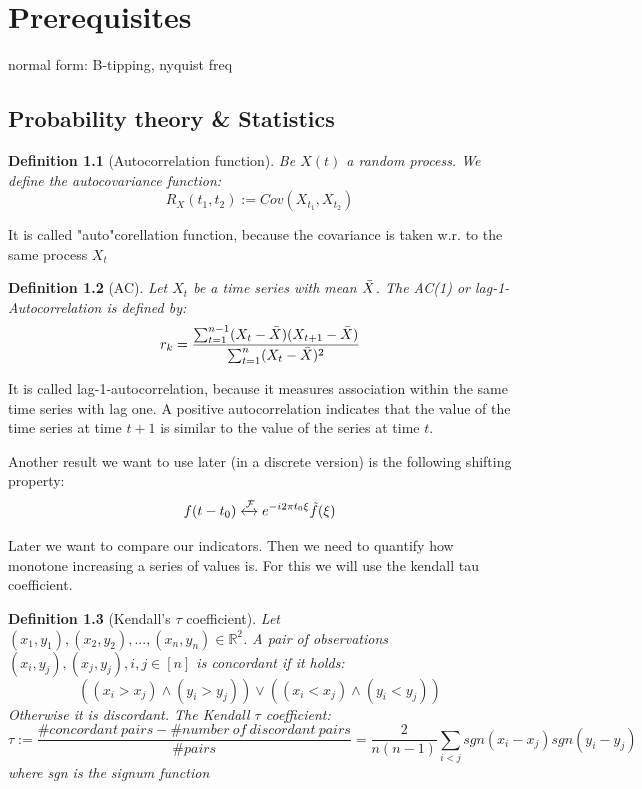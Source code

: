 \documentclass[%
thesis=student,%
coverpage=false,%
titlepage=false,%
headmarks=true, %
german,%
font=libertine, %
math=newpxtx, %
BCOR=5mm,%
coverBCOR=11mm%
]{tumbook}
\newtheorem{definition}{Definition}[section]
\begin{document}
\chapter{Prerequisites}
normal form: B-tipping, nyquist freq


\section{Probability theory \& Statistics}

\begin{definition}[Autocorrelation function]
Be $X(t)$ a random process. We define the autocovariance function: 
\[
R_{X}(t_{1},t_{2}) := Cov(X_{t_{1}},X_{t_{2}})
\]    
\end{definition}

It is called "auto"corellation function, because the covariance is taken w.r. to the same process $X_{t}$


\begin{definition}[AC]
Let $X_{t}$ be a time series with mean $\Bar{X}$. The AC(1) or lag-1-Autocorrelation is defined by: 
\[
r_{k} = \frac{\sum_{t=1}^{n-1}(X_{t}-\Bar{X})(X_{t+1}-\Bar{X})}{\sum_{t=1}^{n}(X_{t}-\Bar{X})^2}
\]
\end{definition}
It is called lag-1-autocorrelation, because it measures association within the same time series with lag one. A positive autocorrelation indicates that the value of the time series at time $t + 1$ is similar to the value of the series at time $t$. 


Another result we want to use later (in a discrete version) is the following shifting property:
\[
f(t-t_{0}) \xleftrightarrow{\mathcal{F}} e^{-i2\pi t_{0}\xi}\Tilde{f}(\xi)
\]

Later we want to compare our indicators. Then we need to quantify how monotone increasing a series of values is. For this we will use the kendall tau coefficient. 

\begin{definition}[Kendall's $\tau$ coefficient]
\label{def:Kendall tau}
Let $(x_{1},y_{1}),(x_{2},y_{2}),...,(x_{n},y_{n})\in \mathbb{R}^{2}$. A pair of observations $(x_{i},y_{j}),(x_{j},y_{j}), i,j \in [n]$ is concordant if it holds:
\[
((x_{i} > x_{j}) \wedge (y_{i} > y_{j})) \vee
((x_{i} < x_{j}) \wedge (y_{i} < y_{j}))
\]
Otherwise it is discordant. The Kendall $\tau$ coefficient:
\[
\tau := \frac{\#concordant\ pairs - \#number\ of\ discordant\ pairs}{\#pairs} = \frac{2}{n(n-1)}\sum_{i<j}sgn(x_{i}-x_{j})sgn(y_{i}-y_{j})
\]
where sgn is the signum function    
\end{definition}
\end{document}
